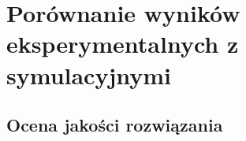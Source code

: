 \section{Porównanie wyników eksperymentalnych z symulacyjnymi}
\label{sec:porownanie}


\subsection{Ocena jakości rozwiązania}
\label{sub:porownanie-ocena}
